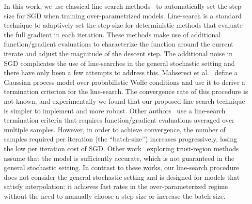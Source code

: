 In this work, we use classical line-search methods~\cite{nocedal2006numerical} to automatically set the step-size for SGD when training over-parametrized models. Line-search is a standard technique to adaptively set the step-size for deterministic methods that evaluate the full gradient in each iteration. These methods make use of additional function/gradient evaluations to characterize the function around the current iterate and adjust the magnitude of the descent step. The additional noise in SGD complicates the use of line-searches in the general stochastic setting and there have only been a few attempts to address this. Mahsereci et al.~\cite{mahsereci2017probabilistic} define a Gaussian process model over probabilistic Wolfe conditions and use it to derive a termination criterion for the line-search. The convergence rate of this procedure is not known, and experimentally we found that our proposed line-search technique is simpler to implement and more robust. Other authors~\cite{friedlander2012hybrid,byrd2012sample, de2016big, paquette2018stochastic,krejic2013line} use a line-search termination criteria that requires function/gradient evaluations averaged over multiple samples. However, in order to achieve convergence, the number of samples required per iteration (the ``batch-size'') increases progressively, losing the low per iteration cost of SGD. Other work~\cite{blanchet2019convergence,gratton2017complexity} exploring trust-region methods assume that the model is sufficiently accurate, which is not guaranteed in the general stochastic setting. In contrast to these works, our line-search procedure does not consider the general stochastic setting and is designed for models that satisfy interpolation; it achieves fast rates in the over-parameterized regime without the need to manually choose a step-size or increase the batch size.
\fi
\endinput
